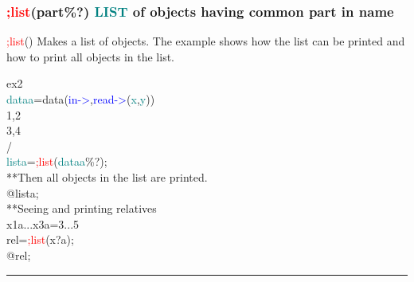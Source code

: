 \subsubsection{\textcolor{Red}{;list}(part\%?) \textcolor{teal}{LIST} of objects having common part in name} 
\label{inpusub2} 
\textcolor{Red}{;list}() Makes a list of objects. The example shows how the list can be printed and how 
to print all objects in the list. 
 
\singlespacing 
\begin{example}[subobjex2]ex2\\ 
\label{subobjex2} 
\noindent \textcolor{teal}{dataa}=\textcolor{VioletRed}{data}(\textcolor{blue}{in->},\textcolor{blue}{read->}(\textcolor{teal}{x},\textcolor{teal}{y}))\\ 
1,2\\ 
3,4\\ 
/  \\ 
\textcolor{teal}{lista}=\textcolor{Red}{;list}(\textcolor{teal}{dataa}\%?);\\ 
{\color{ForestGreen}**Then all objects in the list are printed.}\\ 
@lista;\\ 
{\color{ForestGreen}**Seeing and printing relatives}\\ 
x1a...x3a=3...5\\ 
 
rel=\textcolor{Red}{;list}(x?a);\\ 
@rel;\\ 
\end{example} 
\vspace{-7mm} \rule{5cm}{0.1pt} 
\onehalfspacing 
